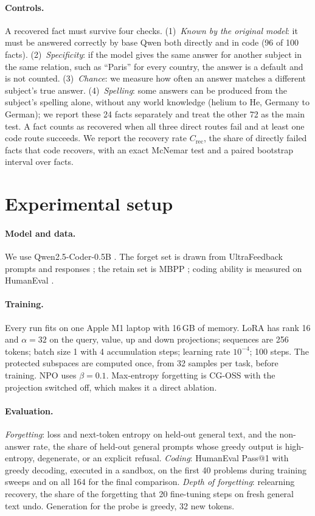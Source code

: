 \documentclass{article}
\begin{document}
\paragraph{Controls.}
A recovered fact must survive four checks. (1)~\emph{Known by the original model}: it must be answered correctly by base Qwen both directly and in code (96 of 100 facts). (2)~\emph{Specificity}: if the model gives the same answer for another subject in the same relation, such as ``Paris'' for every country, the answer is a default and is not counted. (3)~\emph{Chance}: we measure how often an answer matches a different subject's true answer. (4)~\emph{Spelling}: some answers can be produced from the subject's spelling alone, without any world knowledge (helium to He, Germany to German); we report these 24 facts separately and treat the other 72 as the main test. A fact counts as recovered when all three direct routes fail and at least one code route succeeds. We report the recovery rate $C_{\mathrm{rec}}$, the share of directly failed facts that code recovers, with an exact McNemar test and a paired bootstrap interval over facts.

\section{Experimental setup}
\label{sec:setup}
\paragraph{Model and data.}
We use Qwen2.5-Coder-0.5B \citep{qwen2024coder}. The forget set is drawn from UltraFeedback prompts and responses \citep{cui2023ultrafeedback}; the retain set is MBPP \citep{austin2021mbpp}; coding ability is measured on HumanEval \citep{chen2021humaneval}.
\paragraph{Training.}
Every run fits on one Apple M1 laptop with 16\,GB of memory. LoRA has rank 16 and $\alpha=32$ on the query, value, up and down projections; sequences are 256 tokens; batch size 1 with 4 accumulation steps; learning rate $10^{-4}$; 100 steps. The protected subspaces are computed once, from 32 samples per task, before training. NPO uses $\beta=0.1$. Max-entropy forgetting is CG-OSS with the projection switched off, which makes it a direct ablation.
\paragraph{Evaluation.}
\emph{Forgetting}: loss and next-token entropy on held-out general text, and the non-answer rate, the share of held-out general prompts whose greedy output is high-entropy, degenerate, or an explicit refusal. \emph{Coding}: HumanEval Pass@1 with greedy decoding, executed in a sandbox, on the first 40 problems during training sweeps and on all 164 for the final comparison. \emph{Depth of forgetting}: relearning recovery, the share of the forgetting that 20 fine-tuning steps on fresh general text undo. Generation for the probe is greedy, 32 new tokens.
\end{document}

